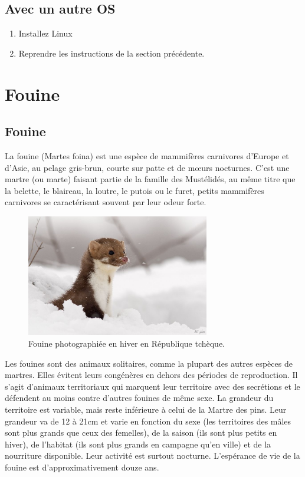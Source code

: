 \subsection{Avec un autre OS}

\begin{enumerate}
 \item Installez Linux
 \item Reprendre les instructions de la section précédente.
\end{enumerate}


\section{Fouine}

\subsection{Fouine}
La fouine (Martes foina) est une espèce de mammifères carnivores d'Europe et d'Asie, au pelage gris-brun, courte sur patte et de mœurs nocturnes. C'est une martre (ou marte) faisant partie de la famille des Mustélidés, au même titre que la belette, le blaireau, la loutre, le putois ou le furet, petits mammifères carnivores se caractérisant souvent par leur odeur forte.

\begin{figure}[ht]
\centering
\includegraphics[width=8cm]{fouine_hiver.jpg}
\caption{Fouine photographiée en hiver en République tchèque.}
\end{figure}

Les fouines sont des animaux solitaires, comme la plupart des autres espèces de martres. Elles évitent leurs congénères en dehors des périodes de reproduction. Il s'agit d'animaux territoriaux qui marquent leur territoire avec des secrétions et le défendent au moins contre d'autres fouines de même sexe. La grandeur du territoire est variable, mais reste inférieure à celui de la Martre des pins. Leur grandeur va de 12 à 21cm et varie en fonction du sexe (les territoires des mâles sont plus grands que ceux des femelles), de la saison (ils sont plus petits en hiver), de l'habitat (ils sont plus grands en campagne qu'en ville) et de la nourriture disponible. Leur activité est surtout nocturne. L’espérance de vie de la fouine est d’approximativement douze ans. \\ ~ \\

